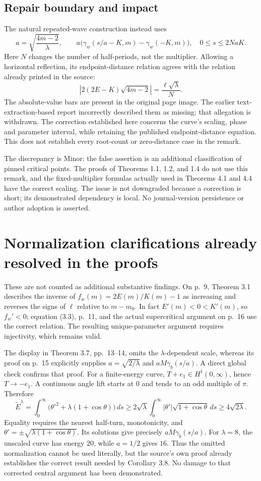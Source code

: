 \documentclass[10pt]{article}
\begin{document}
\subsection*{Repair boundary and impact}
The natural repeated-wave construction instead uses \[a=\sqrt{\frac{4m-2}{\lambda}},\qquad
 a\bigl(\gamma_w(s/a-K,m)-\gamma_w(-K,m)\bigr),
 \quad 0\leq s\leq2NaK.\] Here \(N\) changes the number of half-periods, not the multiplier. Allowing a horizontal reflection, its endpoint-distance relation agrees with the relation already printed in the source: \[\left|2(2E-K)\sqrt{4m-2}\right|=\frac{\ell\sqrt\lambda}{N}.\] The absolute-value bars are present in the original page image. The earlier text-extraction-based report incorrectly described them as missing; that allegation is withdrawn. The correction established here concerns the curve’s scaling, phase and parameter interval, while retaining the published endpoint-distance equation. This does not establish every root-count or zero-distance case in the remark.\par
The discrepancy is Minor: the false assertion is an additional classification of pinned critical points. The proofs of Theorems 1.1, 1.2, and 1.4 do not use this remark, and the fixed-multiplier formulas actually used in Theorems 4.1 and 4.4 have the correct scaling. The issue is not downgraded because a correction is short; its demonstrated dependency is local. No journal-version persistence or author adoption is asserted.\par
\section*{Normalization clarifications already resolved in the proofs}
These are not counted as additional substantive findings. On p. 9, Theorem 3.1 describes the inverse of \(f_w(m)=2E(m)/K(m)-1\) as increasing and reverses the signs of \(\ell\) relative to \(m-m_0\). In fact \(E'(m)<0<K'(m)\), so \(f_w'<0\); equation (3.3), p. 11, and the actual supercritical argument on p. 16 use the correct relation. The resulting unique-parameter argument requires injectivity, which remains valid.\par
The display in Theorem 3.7, pp. 13–14, omits the \(\lambda\)-dependent scale, whereas its proof on p. 15 explicitly supplies \(a=\sqrt{2/\lambda}\) and \(aM\gamma_b(s/a)\). A direct global check confirms that proof. For a finite-energy curve, \(T+e_1\in H^1(0,\infty)\), hence \(T\to-e_1\). A continuous angle lift starts at \(0\) and tends to an odd multiple of \(\pi\). Therefore \[\widetilde E^\lambda
 =\int_0^\infty\bigl(\theta'^2+\lambda(1+\cos\theta)\bigr)\,ds
 \geq 2\sqrt\lambda\int_0^\infty
       |\theta'|\sqrt{1+\cos\theta}\,ds
 \geq4\sqrt{2\lambda}.\] Equality requires the nearest half-turn, monotonicity, and \(\theta'=\pm\sqrt{\lambda(1+\cos\theta)}\). Its solutions give precisely \(aM\gamma_b(s/a)\). For \(\lambda=8\), the unscaled curve has energy \(20\), while \(a=1/2\) gives \(16\). Thus the omitted normalization cannot be used literally, but the source’s own proof already establishes the correct result needed by Corollary 3.8. No damage to that corrected central argument has been demonstrated.\par
\end{document}
